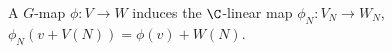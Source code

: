 A $G$-map $\phi\colon V\to W$ induces the $\C$-linear map $\phi_N\colon V_N\to W_N$, $\phi_N(v+V(N))=\phi(v)+W(N)$.
